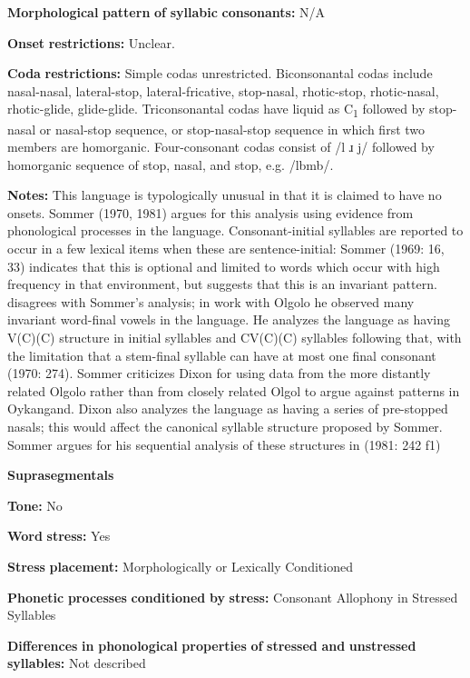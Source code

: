 \textbf{Morphological} \textbf{pattern} \textbf{of} \textbf{syllabic} \textbf{consonants:} N/A

\textbf{Onset} \textbf{restrictions:} Unclear.

\textbf{Coda} \textbf{restrictions:} Simple codas unrestricted. Biconsonantal codas include nasal-nasal, lateral-stop, lateral-fricative, stop-nasal, rhotic-stop, rhotic-nasal, rhotic-glide, glide-glide. Triconsonantal codas have liquid as C\textsubscript{1} followed by stop-nasal or nasal-stop sequence, or stop-nasal-stop sequence in which first two members are homorganic. Four-consonant codas consist of /l ɹ j/ followed by homorganic sequence of stop, nasal, and stop, e.g. /lbmb/.

\textbf{Notes:} This language is typologically unusual in that it is claimed to have no onsets. Sommer (1970, 1981) argues for this analysis using evidence from phonological processes in the language. Consonant-initial syllables are reported to occur in a few lexical items when these are sentence-initial: Sommer (1969: 16, 33) indicates that this is optional and limited to words which occur with high frequency in that environment, but \citet{Sommer1981} suggests that this is an invariant pattern. \citet{Dixon1970} disagrees with Sommer’s analysis; in work with Olgolo he observed many invariant word-final vowels in the language. He analyzes the language as having V(C)(C) structure in initial syllables and CV(C)(C) syllables following that, with the limitation that a stem-final syllable can have at most one final consonant (1970: 274). Sommer criticizes Dixon for using data from the more distantly related Olgolo rather than from closely related Olgol to argue against patterns in Oykangand. Dixon also analyzes the language as having a series of pre-stopped nasals; this would affect the canonical syllable structure proposed by Sommer. Sommer argues for his sequential analysis of these structures in (1981: 242 f1)

\textbf{Suprasegmentals}

\textbf{Tone:} No

\textbf{Word} \textbf{stress:} Yes

\textbf{Stress} \textbf{placement:} Morphologically or Lexically Conditioned

\textbf{Phonetic} \textbf{processes} \textbf{conditioned} \textbf{by} \textbf{stress:} Consonant Allophony in Stressed Syllables

\textbf{Differences} \textbf{in} \textbf{phonological} \textbf{properties} \textbf{of} \textbf{stressed} \textbf{and} \textbf{unstressed} \textbf{syllables:} Not described

